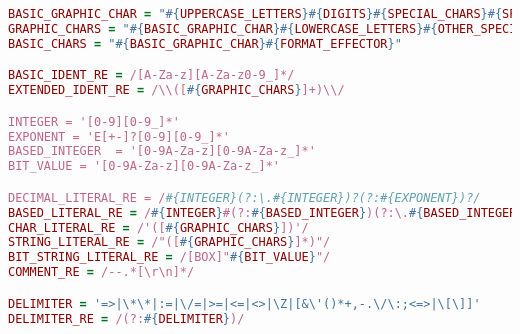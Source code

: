 \begin{lstlisting}[language=Ruby, style=rubystyle]
BASIC_GRAPHIC_CHAR = "#{UPPERCASE_LETTERS}#{DIGITS}#{SPECIAL_CHARS}#{SPACE_CHARS}"
GRAPHIC_CHARS = "#{BASIC_GRAPHIC_CHAR}#{LOWERCASE_LETTERS}#{OTHER_SPECIAL_CHARS}"
BASIC_CHARS = "#{BASIC_GRAPHIC_CHAR}#{FORMAT_EFFECTOR}"

BASIC_IDENT_RE = /[A-Za-z][A-Za-z0-9_]*/
EXTENDED_IDENT_RE = /\\([#{GRAPHIC_CHARS}]+)\\/

INTEGER = '[0-9][0-9_]*'
EXPONENT = 'E[+-]?[0-9][0-9_]*'
BASED_INTEGER  = '[0-9A-Za-z][0-9A-Za-z_]*'
BIT_VALUE = '[0-9A-Za-z][0-9A-Za-z_]*'

DECIMAL_LITERAL_RE = /#{INTEGER}(?:\.#{INTEGER})?(?:#{EXPONENT})?/
BASED_LITERAL_RE = /#{INTEGER}#(?:#{BASED_INTEGER})(?:\.#{BASED_INTEGER})?#(?:#{EXPONENT})?/
CHAR_LITERAL_RE = /'([#{GRAPHIC_CHARS}])'/
STRING_LITERAL_RE = /"([#{GRAPHIC_CHARS}]*)"/
BIT_STRING_LITERAL_RE = /[BOX]"#{BIT_VALUE}"/
COMMENT_RE = /--.*[\r\n]*/

DELIMITER = '=>|\*\*|:=|\/=|>=|<=|<>|\Z|[&\'()*+,-.\/\:;<=>|\[\]]'
DELIMITER_RE = /(?:#{DELIMITER})/


\end{lstlisting}
